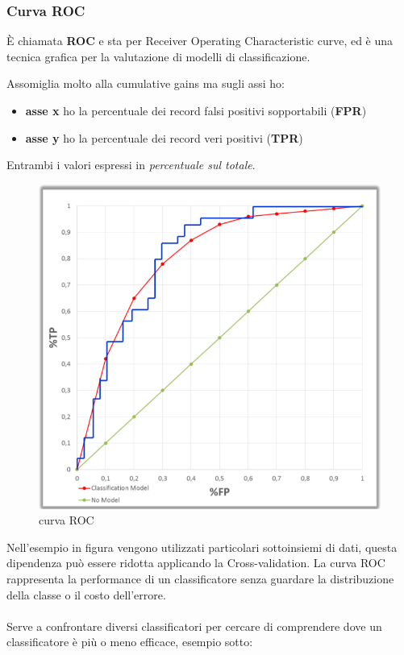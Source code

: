 \subsubsection{Curva ROC}
\begin{defn}
	\`E chiamata \textbf{ROC} e sta per Receiver Operating Characteristic curve, ed è una tecnica grafica per la valutazione di modelli di classificazione.
\end{defn} 
\noindent
Assomiglia molto alla cumulative gains ma sugli assi ho:
\begin{itemize}
	\item \textbf{asse x} ho la percentuale dei record falsi positivi sopportabili (\textbf{FPR})
	\item \textbf{asse y} ho la percentuale dei record veri positivi (\textbf{TPR})
\end{itemize}
Entrambi i valori espressi in \textit{percentuale sul totale}. 
\begin{figure}[H]
	\centering
	\includegraphics[height=0.6 \linewidth]{classification/pict/roc.png}
	\caption{curva ROC}
\end{figure}
Nell'esempio in figura vengono utilizzati particolari sottoinsiemi di dati, questa dipendenza può essere ridotta applicando la Cross-validation. La curva ROC rappresenta la performance di un classificatore senza guardare la distribuzione della classe o il costo dell'errore.\\
\\
Serve a confrontare diversi classificatori per cercare di comprendere dove un classificatore \`e pi\`u o meno efficace, esempio sotto:


